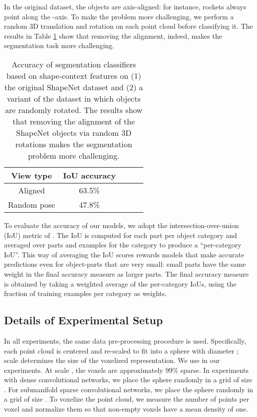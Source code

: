 \documentclass[10pt,twocolumn,letterpaper]{article}
\begin{document}
In the original dataset, the objects are axis-aligned: for instance, rockets always point along the -axis. To make the problem more challenging, we perform a random 3D translation and rotation on each point cloud before classifying it. The results in Table \ref{tbl:shapeContext} show that removing the alignment, indeed, makes the segmentation task more challenging.

\begin{table}[tb]
\vspace{3pt}
\centering{}
\begin{tabular}{ccccc}
\toprule
\textbf{View type}  &\textbf{IoU accuracy}\\
\midrule
Aligned & 63.5\%\\
Random pose & 47.8\%\\
\bottomrule
\end{tabular}
\caption{Accuracy of segmentation classifiers based on shape-context features on (1) the original ShapeNet dataset and (2) a variant of the dataset in which objects are randomly rotated. The results show that removing the alignment of the ShapeNet objects via random 3D rotations makes the segmentation problem more challenging.\label{tbl:shapeContext}}
\end{table}

To evaluate the accuracy of our models, we adopt the intersection-over-union (IoU) metric of \cite{yi2017large}.
The IoU is computed for each part per object category and averaged over parts and examples for the category to produce a ``per-category IoU''. This way of averaging the IoU scores rewards models that make accurate predictions even for object-parts that are very small: small parts have the same weight in the final accuracy measure as larger parts. The final accuracy measure is obtained by taking a weighted average of the per-category IoUs, using the fraction of training examples per category as weights.


\subsection{Details of Experimental Setup}
\label{sec:details_exp}
In all experiments, the same data pre-processing procedure is used. Specifically, each point cloud is centered and re-scaled to fit into a sphere with diameter ; scale  determines the size of the voxelized representation. We use  in our experiments. At scale , the voxels are approximately 99\% sparse. In experiments with dense convolutional networks, we place the sphere randomly in a grid of size . For submanifold sparse convolutional networks, we place the sphere randomly in a grid of size .
To voxelize the point cloud, we measure the number of points per voxel and normalize them so that non-empty voxels have a mean density of one.
\end{document}
